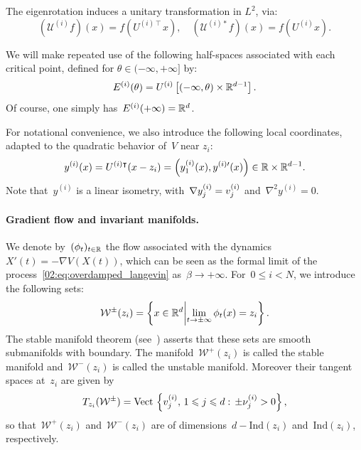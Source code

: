     The eigenrotation induces a unitary transformation in $L^2$, via:
   \begin{equation}
    \label{02:eq:eigvecs_unitary}
     \left(\mathcal U^{(i)} f\right)(x) = f\left(U^{(i)\intercal}x\right),\quad  \left(\mathcal U^{(i)*} f\right)(x) = f\left( U^{(i)}x\right).
   \end{equation}

    We will make repeated use of the following half-spaces associated with each critical point, defined for $\theta\in(-\infty,+\infty]$ by:
    \begin{equation}
        \label{02:eq:half_space}
        \halfSpace{i}(\theta) = \hessPassage{i}\left[(-\infty,\theta)\times\R^{d-1}\right].
    \end{equation}
    Of course, one simply has~$E^{(i)}(+\infty) = \mathbb{R}^d$.

    For notational convenience, we also introduce the following local coordinates, adapted to the quadratic behavior of~$V$ near $z_i$:
    \begin{equation}
        \label{02:eq:local_coordinates}
        y^{(i)}(x) = \hessPassage[\intercal]{i}(x-z_i) = \left(y_1^{(i)}(x),y^{(i)\prime}(x)\right) \in \R \times \R^{d-1}.
    \end{equation}
    Note that~$y^{(i)}$ is a linear isometry, with~$\nabla y_j^{(i)} = v^{(i)}_{j}$ and~$\nabla^2 y^{(i)}=0$.

    \paragraph{Gradient flow and invariant manifolds.}
    We denote by~$(\phi_t)_{t\in \mathbb{R}}$ the flow associated with the dynamics~$X'(t) = -\nabla V(X(t))$, which can be seen as the formal limit of the process~\eqref{02:eq:overdamped_langevin} as~$\beta\to+\infty$. For~$0\leq i< N$, we introduce the following sets:
    \begin{equation}
        \label{02:eq:stable_manifold}
        \mathcal W^{\pm}(z_i) = \left\{x\in\R^d\middle|\underset{t\to\pm\infty}{\lim}\,\phi_t(x)=z_i\right\}.
    \end{equation}
    The stable manifold theorem (see~\cite[Section 9.2]{T24}) asserts that these sets are smooth submanifolds with boundary. The manifold~$\mathcal W^+(z_i)$ is called the stable manifold and~$\mathcal W^-(z_i)$ is called the unstable manifold. Moreover their tangent spaces at~$z_i$ are given by
    \[T_{z_i}(\mathcal W^{\pm}) = \mathrm{Vect}\,\left\{v^{(i)}_{j},\,1\leqslant j\leqslant d:\,\pm\nu^{(i)}_{j} > 0 \right\},\]
    so that~$\mathcal W^+(z_i)$ and~$\mathcal W^-(z_i)$ are of dimensions~$d-\mathrm{Ind}(z_i)$ and~$\mathrm{Ind}(z_i)$, respectively.

